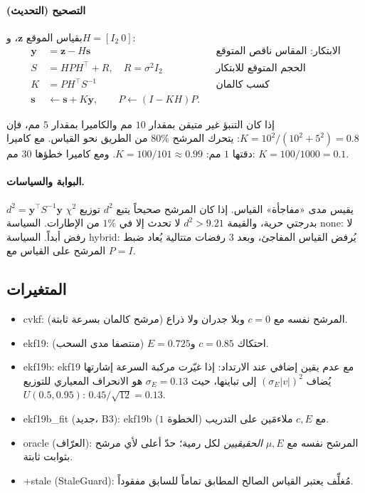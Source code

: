 \documentclass[11pt,a4paper]{article}
\newcommand{\en}[1]{\textenglish{#1}}
\begin{document}
\paragraph{التصحيح (التحديث)} بقياس الموقع $\bm z$، و$H=[I_2\ 0]$:
\begin{align*}
\bm y&=\bm z-H\bm s &&\text{الابتكار: المقاس ناقص المتوقع}\\
S&=HPH^\top+R,\quad R=\sigma^2I_2 &&\text{الحجم المتوقع للابتكار}\\
K&=PH^\top S^{-1} &&\text{كسب كالمان}\\
\bm s&\leftarrow\bm s+K\bm y,\qquad P\leftarrow(I-KH)P.
\end{align*}

\begin{example}
إذا كان التنبؤ غير متيقن بمقدار $10$ مم والكاميرا بمقدار $5$ مم، فإن $K=10^2/(10^2+5^2)=0.8$: يتحرك المرشح $80\%$ من الطريق نحو
القياس. مع كاميرا دقتها $1$ مم: $K=100/101\approx0.99$. ومع كاميرا خطؤها $30$ مم: $K=100/1000=0.1$.
\end{example}

\paragraph{البوابة والسياسات.} $d^2=\bm y^\top S^{-1}\bm y$ يقيس مدى «مفاجأة» القياس. إذا كان المرشح صحيحاً يتبع $d^2$ توزيع
$\chi^2$ بدرجتي حرية، والقيمة $d^2>9.21$ لا تحدث إلا في $1\%$ من الإطارات. السياسة \en{none}: لا رفض أبداً. السياسة \en{hybrid}:
يُرفض القياس المفاجئ، وبعد $3$ رفضات متتالية يُعاد ضبط المرشح على القياس مع $P=I$.

\subsection{المتغيرات}
\begin{itemize}
\item \en{cvkf}: المرشح نفسه مع $c=0$ وبلا جدران ولا ذراع (مرشح كالمان بسرعة ثابتة).
\item \en{ekf19}: احتكاك $c=0.85$ و$E=0.725$ (منتصفا مدى السحب).
\item \en{ekf19b}: \en{ekf19} مع عدم يقين إضافي عند الارتداد: إذا غيّرت مركبة السرعة إشارتها يُضاف $(\sigma_E|v|)^2$ إلى تباينها،
حيث $\sigma_E=0.13$ هو الانحراف المعياري للتوزيع $U(0.5,0.95)$: $0.45/\sqrt{12}=0.13$.
\item \en{ekf19b\_fit} (جديد، \en{B3}): \en{ekf19b} مع $c,E$ ملاءمَين على التدريب (الخطوة $1$).
\item \en{oracle} (العرّاف): المرشح نفسه مع $\mu,E$ \emph{الحقيقيين} لكل رمية؛ حدّ أعلى لأي مرشح بثوابت ثابتة.
\item \en{+stale} (\en{StaleGuard}): مُغلِّف يعتبر القياس الصالح المطابق تماماً للسابق مفقوداً.
\end{itemize}
\end{document}

